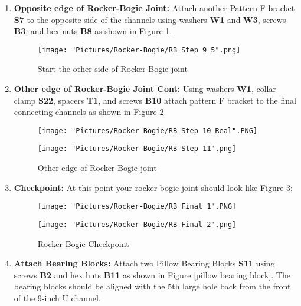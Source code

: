 \documentclass[12pt]{article}
\begin{document}
\begin{enumerate}
\item \textbf{Opposite edge of Rocker-Bogie Joint:} Attach another Pattern F bracket \textbf{S7} to the opposite side of the channels using washers \textbf{W1} and \textbf{W3}, screws \textbf{B3}, and hex nuts \textbf{B8} as shown in Figure \ref{start other edge rocker bogie}.

\begin{figure}[H]
	\centering
	\texttt{[image: "Pictures/Rocker-Bogie/RB Step 9\_5".png]}
	\caption{Start the other side of Rocker-Bogie joint}
	\label{start other edge rocker bogie}
\end{figure}

\item \textbf{Other edge of Rocker-Bogie Joint Cont: } Using washers \textbf{W1}, collar clamp \textbf{S22},  spacers \textbf{T1}, and screws \textbf{B10} attach pattern F bracket to the final connecting channels as shown in Figure \ref{other edge rocker bogie}.

\begin{figure}[H]
  \centering
  \begin{minipage}[b]{0.45\textwidth}
    \texttt{[image: "Pictures/Rocker-Bogie/RB Step 10 Real".PNG]}
  \end{minipage}
  \hfill
  \begin{minipage}[b]{0.45\textwidth}
    \texttt{[image: "Pictures/Rocker-Bogie/RB Step 11".png]}
  \end{minipage}
  \caption{Other edge of Rocker-Bogie joint}
  \label{other edge rocker bogie}
\end{figure}

\item \textbf{Checkpoint:} At this point your rocker bogie joint should look like Figure \ref{checkpoint}:

\begin{figure}[H]
  \centering
  \begin{minipage}[b]{0.45\textwidth}
    \texttt{[image: "Pictures/Rocker-Bogie/RB Final 1".PNG]}
  \end{minipage}
  \hfill
  \begin{minipage}[b]{0.45\textwidth}
    \texttt{[image: "Pictures/Rocker-Bogie/RB Final 2".png]}
  \end{minipage}
  \caption{Rocker-Bogie Checkpoint}
  \label{checkpoint}
\end{figure}

\item \textbf{Attach Bearing Blocks:} Attach two Pillow Bearing Blocks \textbf{S11} using screws \textbf{B2} and hex huts \textbf{B11} as shown in Figure \ref{pillow bearing block}. The bearing blocks should be aligned with the 5th large hole back from the front of the 9-inch U channel.


\end{enumerate}
\end{document}
